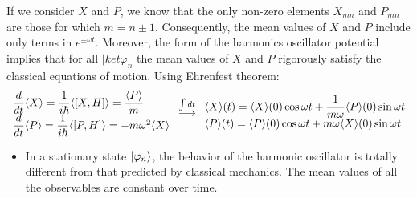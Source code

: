 If we consider $X$ and $P$, we know that the only non-zero elements $X_{mn}$ and $P_{mn}$ are those for which $m=n\pm1$. Consequently, the mean values of $X$ and $P$ include only terms in $e^{\pm\omega t}$.
Moreover, the form of the harmonics oscillator potential implies that for all $|ket{\varphi_n}$ the mean values of $X$ and $P$ rigorously satisfy the classical equations of motion. Using Ehrenfest theorem:
\begin{align}
    \begin{array}{l}
    \dfrac{d}{dt}\langle X\rangle=\dfrac{1}{i\hbar}\langle[X,H]\rangle=\dfrac{\langle P\rangle}{m}\\    
    \dfrac{d}{dt}\langle P\rangle=\dfrac{1}{i\hbar}\langle[P,H]\rangle=-m\omega^2\langle X\rangle
    \end{array}
    \stackrel{\int dt}{\longrightarrow}
    \begin{array}{l}
        \langle X\rangle(t)=\langle X\rangle(0)\cos\omega t+\dfrac{1}{m\omega}\langle P\rangle(0)\sin\omega t\\
        \langle P\rangle(t)=\langle P\rangle(0)\cos\omega t+m\omega\langle X\rangle(0)\sin\omega t
    \end{array}
\end{align}
\begin{itemize}[itemsep=0pt,topsep=0pt]
    \item In a stationary state $|\varphi_n\rangle$, the behavior of the harmonic oscillator is totally different from that predicted by classical mechanics. 
    The mean values of all the observables are constant over time.
\end{itemize}

